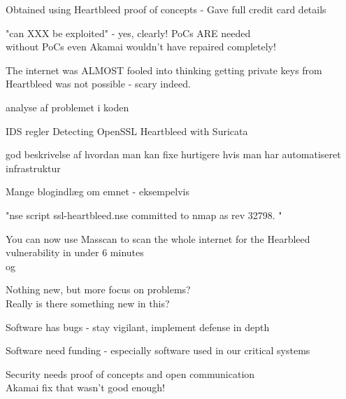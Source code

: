 \documentclass[20pt,landscape,a4paper,footrule]{foils}
\begin{document}
\begin{list2}
\item Obtained using Heartbleed proof of concepts - Gave full credit card details
\item "can XXX be exploited" - yes, clearly! PoCs ARE needed\\
without PoCs even Akamai wouldn't have repaired completely!
\item The internet was ALMOST fooled into thinking getting private keys from Heartbleed was not possible - scary indeed.
\end{list2}


\begin{list2}
\item analyse af problemet i koden\\
{\small{}}
\item IDS regler Detecting OpenSSL Heartbleed with Suricata\\
{\small{}}
\item god beskrivelse af hvordan man kan fixe hurtigere hvis man har automatiseret infrastruktur\\

\item Mange blogindlæg om emnet - eksempelvis\\
{\small{} }

\item "nse script ssl-heartbleed.nse committed to nmap as rev 32798. "
\item You can now use Masscan to scan the whole internet for the Hearbleed vulnerability in under 6 minutes \\ og {\small{}}
\end{list2}


\begin{list1}
\item Nothing new, but more focus on problems?\\
Really is there something new in this?
\item Software has bugs - stay vigilant, implement defense in depth
\item Software need funding - especially software used in our critical systems
\item Security needs proof of concepts and open communication\\
Akamai fix that wasn't good enough!
\end{list1}
\end{document}
